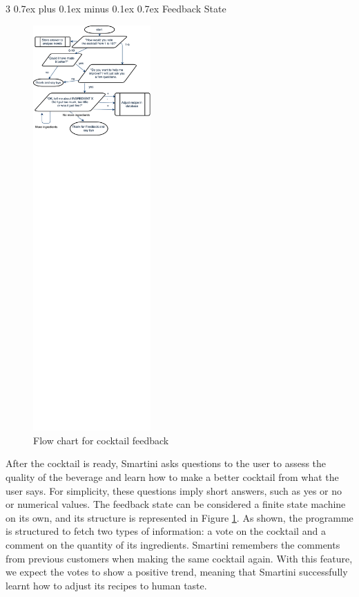 \documentclass[conference]{IEEEtran}
\makeatletter
\def\subsubsection{\@startsection{subsubsection}%
	{3}%
	{\z@}%
	{0.7ex plus 0.1ex minus 0.1ex}%
	{0.7ex}%
	{\normalfont\normalsize\itshape}}%
\makeatother
\begin{document}
\subsubsection{Feedback State}

 \begin{figure}
	\centering
	\includegraphics[width=0.4\textwidth]{figures/feedback}
	\caption{Flow chart for cocktail feedback}
	\label{fig:feedback}
\end{figure} 

After the cocktail is ready, Smartini asks questions to the user to assess the quality of the beverage and learn how to make a better cocktail from what the user says. For simplicity, these questions imply short answers, such as yes or no or numerical values. The feedback state can be considered a finite state machine on its own, and its structure is represented in Figure \ref{fig:feedback}. As shown, the programme is structured to fetch two types of information: a vote on the cocktail and a comment on the quantity of its ingredients. Smartini remembers the comments from previous customers when making the same cocktail again. With this feature, we expect the votes to show a positive trend, meaning that Smartini successfully learnt how to adjust its recipes to human taste. 
\end{document}
